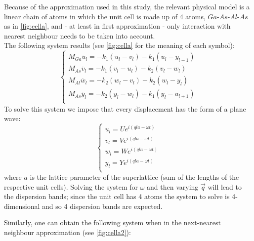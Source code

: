 \documentclass{article}
\begin{document}
Because of the approximation used in this study, the relevant physical model is a linear chain of atoms in which the unit cell is made up of 4 atoms, $Ga$-$As$-$Al$-$As$ as in \autoref{fig:cella}, and - at least in first approximation - only interaction with nearest neighbour needs to be taken into account. \\
The following system results (see \autoref{fig:cella} for the meaning of each symbol):
\begin{equation}
	\begin{cases}
	M_{Ga}\ddot{u_l} = -k_1(u_l-v_l) - k_1(u_l-y_{l-1}) \\
	M_{As}\ddot{v_l} = -k_1(v_l-u_l) - k_2(v_l-w_l) \\
	M_{Al}\ddot{w_l} = -k_2(w_l-v_l) - k_2(w_l-y_l) \\
	M_{As}\ddot{y_l} = -k_2(y_l-w_l) - k_1(y_l-u_{l+1}) \\
	\end{cases}
	\label{eq:sistema}	
\end{equation}
To solve this system we impose that every displacement has the form of a plane wave:
\begin{equation}
	\begin{cases}
	u_l = Ue^{i(qla-\omega t)} \\
	v_l = Ve^{i(qla-\omega t)} \\
	w_l = We^{i(qla-\omega t)} \\
	y_l = Ye^{i(qla-\omega t)} \\
	\end{cases}
	\label{eq:onde piane}
\end{equation}
where $a$ is the lattice parameter of the superlattice (sum of the lengths of the respective unit cells).
Solving the system for $\omega$ and then varying $\vec{q}$ will lead to the dispersion bands; since the unit cell has 4 atoms the system to solve is 4-dimensional and so 4 dispersion bands are expected. \par


Similarly, one can obtain the following system when in the next-nearest neighbour approximation (see \autoref{fig:cella2}):
\end{document}
